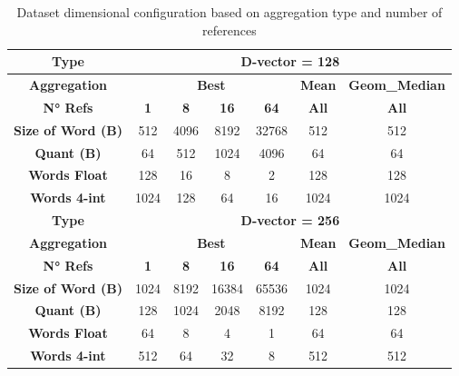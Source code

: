\begin{table}[!h]
    \centering
    \renewcommand{\arraystretch}{1.2}
    \begin{tabular}{|c|cccccc|}
        \hline
        \textbf{Type} & \multicolumn{6}{c|}{\textbf{D-vector = 128}} \\
        \hline
        \textbf{Aggregation} & \multicolumn{4}{c}{\textbf{Best}} & \textbf{Mean} & \textbf{Geom\_Median} \\
        \hline
        \textbf{N° Refs} & \textbf{1} & \textbf{8} & \textbf{16} & \textbf{64} & \textbf{All} & \textbf{All} \\
        \hline 
        \textbf{Size of Word (B)} & 512 & 4096 & 8192 & 32768 & 512 & 512 \\
        \textbf{Quant (B)}        & 64 & 512 & 1024 & 4096 & 64 & 64 \\
        \textbf{Words Float}      & 128 & 16 & 8 & 2 & 128 & 128 \\
        \textbf{Words 4-int}      & 1024 & 128 & 64 & 16 & 1024 & 1024 \\
        \hline
        \textbf{Type} & \multicolumn{6}{c|}{\textbf{D-vector = 256}} \\
        \hline
        \textbf{Aggregation} & \multicolumn{4}{c}{\textbf{Best}} & \textbf{Mean} & \textbf{Geom\_Median} \\
        \hline
        \textbf{N° Refs} & \textbf{1} & \textbf{8} & \textbf{16} & \textbf{64} & \textbf{All} & \textbf{All} \\
        \hline 
        \textbf{Size of Word (B)} & 1024 & 8192 & 16384 & 65536 & 1024 & 1024 \\
        \textbf{Quant (B)}        & 128 & 1024 & 2048 & 8192 & 128 & 128 \\
        \textbf{Words Float}      & 64 & 8 & 4 & 1 & 64 & 64 \\
        \textbf{Words 4-int}      & 512 & 64 & 32 & 8 & 512 & 512 \\
        \hline
    \end{tabular}
    \caption{Dataset dimensional configuration based on aggregation type and number of references}
     \label{table:word sizes}
\end{table}
